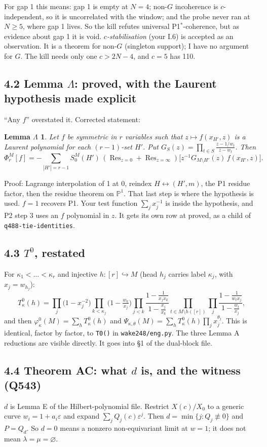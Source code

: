 \documentclass[11pt]{article}
\newcommand{\gr}[1]{\textsf{#1}}
\newcommand{\Res}{\operatorname{Res}}
\theoremstyle{plain}
\newtheorem*{lemL}{Lemma $\Lambda$}
\begin{document}
For gap 1 this means: gap 1 is empty at $N=4$; non-$G$ incoherence is $c$-independent, so it is uncorrelated with the
window; and the probe never ran at $N\ge5$, where gap 1 lives. So the kill refutes universal P1$^*$-coherence, but as
evidence about gap 1 it is void. \emph{$c$-stabilisation} (your I.6) is accepted as an observation. It is a theorem for
non-$G$ (singleton support); I have no argument for $G$. The kill needs only one $c>2N-4$, and $c=5$ has 110.

\subsection*{4.2 Lemma $\Lambda$: \gr{proved}, with the Laurent hypothesis made explicit}
``Any $f$'' overstated it. Corrected statement:
\begin{lemL}
Let $f$ be symmetric in $r$ variables such that $z\mapsto f(x_{H'},z)$ is a Laurent polynomial for each $(r{-}1)$-set
$H'$. Put $G_S(z)=\prod_{t\in S}\frac{z-1/w_t}{z-w_t}$. Then
\[\Phi^M_r[f]=-\sum_{|H'|=r-1}S^M_0(H')\,(\Res_{z=0}+\Res_{z=\infty})\big[z^{-1}G_{M\setminus H'}(z)\,f(x_{H'},z)\big].\]
\end{lemL}
Proof: Lagrange interpolation of 1 at 0, reindex $H\leftrightarrow(H',m)$, the P1 residue factor, then the residue
theorem on $\mathbb P^1$. That last step is where the hypothesis is used. $f=1$ recovers P1. Your test function
$\sum_jx_j^{-1}$ is inside the hypothesis, and P2 step 3 uses an $f$ polynomial in $z$. It gets its own row at
\gr{proved}, as a child of \texttt{q488-tie-identities}.

\subsection*{4.3 $T^0$, restated}
For $\kappa_1<\dots<\kappa_r$ and injective $h:[r]\hookrightarrow M$ (head $h_j$ carries label $\kappa_j$, with
$x_j=w_{h_j}$):
\[T^0_\kappa(h)=\prod_{j}\Big(1-x_j^{-2}\Big)\prod_{k<\kappa_j}\Big(1-\tfrac{w_k}{x_j}\Big)
\prod_{j<k}\frac{1-\frac1{x_jx_k}}{1-\frac{x_j}{x_k}}\prod_{t\in M\setminus h([r])}\prod_j\frac{1-\frac1{w_tx_j}}{1-\frac{w_t}{x_j}},\]
and then $\varphi^0_\kappa(M)=\sum_hT^0_\kappa(h)$ and $\Psi_{\kappa,\theta}(M)=\sum_hT^0_\kappa(h)\prod_jx_j^{\theta_j}$.
This is identical, factor by factor, to \texttt{T0()} in \texttt{wake248/eng.py}. The three Lemma A reductions are
visible directly. It goes into \S1 of the dual-block file.

\subsection*{4.4 Theorem AC: what $d$ is, and the witness (Q543)}
$d$ is Lemma E of the Hilbert-polynomial file. Restrict $X(c)/X_0$ to a generic curve $w_i=1+a_i\varepsilon$ and expand
$\sum_jQ_j(c)\varepsilon^j$. Then $d=\min\{j:Q_j\not\equiv0\}$ and $P=Q_d$. So $d=0$ means a nonzero non-equivariant
limit at $w=1$; it does not mean $\lambda=\mu=\varnothing$.
\end{document}
